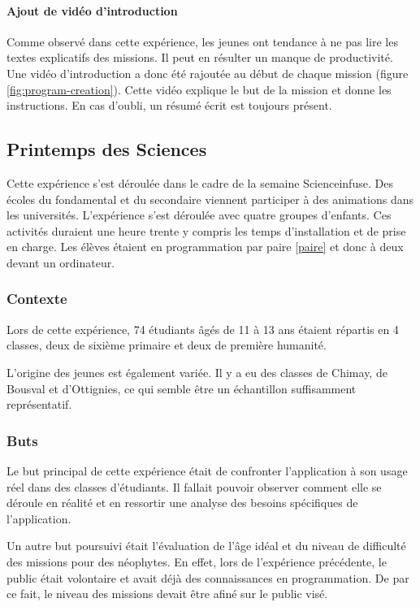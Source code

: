 \paragraph{Ajout de vidéo d'introduction}
Comme observé dans cette expérience, les jeunes ont tendance à ne pas lire les textes explicatifs des missions. Il peut en résulter un manque de productivité. Une vidéo d'introduction a donc été rajoutée au début de chaque mission (figure \ref{fig:program-creation}). Cette vidéo explique le but de la mission et donne les instructions. En cas d'oubli, un résumé écrit est toujours présent.

\subsection{Printemps des Sciences}
Cette expérience s'est déroulée dans le cadre de la semaine Scienceinfuse. Des écoles du fondamental et du secondaire viennent participer à des animations dans les universités. L'expérience s'est déroulée avec quatre groupes d'enfants. Ces activités duraient une heure trente y compris les temps d'installation et de prise en charge. Les élèves étaient en programmation par paire \ref{paire} et donc à deux devant un ordinateur.

\subsubsection{Contexte}
Lors de cette expérience, 74 étudiants âgés de 11 à 13 ans étaient répartis en 4 classes, deux de sixième primaire et deux de première humanité.

L'origine des jeunes est également variée. Il y a eu des classes de Chimay, de Bousval et d'Ottignies, ce qui semble être un échantillon suffisamment représentatif.

\subsubsection{Buts}
Le but principal de cette expérience était de confronter l'application à son usage réel dans des classes d'étudiants. Il fallait pouvoir observer comment elle se déroule en réalité et en ressortir une analyse des besoins spécifiques de l'application.

Un autre but poursuivi était l'évaluation de l'âge idéal et du niveau de difficulté des missions pour des néophytes. En effet, lors de l'expérience précédente, le public était volontaire et avait déjà des connaissances en programmation. De par ce fait, le niveau des missions devait être afiné sur le public visé.

